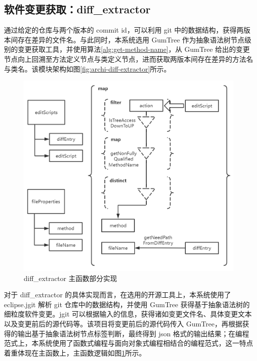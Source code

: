 \subsection{软件变更获取：diff\_extractor}

通过给定的仓库与两个版本的 commit id，可以利用 git 中的数据结构，获得两版本间存在差异的文件名。与此同时，本系统选用 GumTree 作为抽象语法树节点级别的变更获取工具，并使用算法\ref{alg:get-method-name}，从 GumTree 给出的变更节点向上回溯至方法定义节点与类定义节点，进而获取两版本间存在差异的方法名与类名。该模块架构如图\ref{fig:archi-diff-extractor}所示。

\begin{figure}[htb]
    \centering
    \includegraphics[width=.9\textwidth]{figures/diff-extractor-main.png}
    \caption{diff\_extractor 主函数部分实现}
    \label{fig:diff-extractor-main}
\end{figure}

对于 diff\_extractor 的具体实现而言，在选用的开源工具上，本系统使用了 eclipse.jgit 解析 git 仓库中的数据结构，并使用 GumTree 获得基于抽象语法树的细粒度软件变更。jgit 可以根据输入的信息，获得诸如变更文件名、具体变更文本以及变更前后的源代码等。该项目将变更前后的源代码传入 GumTree，再根据获得的输出基于抽象语法树节点标签判断，最终得到 json 格式的输出结果；在编程范式上，本系统使用了函数式编程与面向对象式编程相结合的编程范式，这一特点着重体现在主函数上，主函数逻辑如图\ref{fig:diff-extractor-main}所示。

